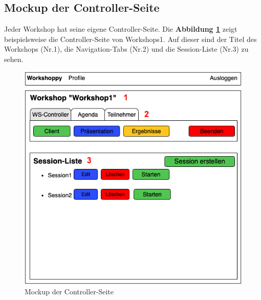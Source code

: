 \newpage
\subsection{Mockup der Controller-Seite}
\label{subsec:mockup der controller-seite}
Jeder Workshop hat seine eigene Controller-Seite. Die \textbf{Abbildung \ref{fig:controller-seite}} zeigt beispielsweise die Controller-Seite von \glqq Workshops1\grqq{}. Auf dieser sind der Titel des Workshops (Nr.1), die Navigation-Tabs (Nr.2) und die Session-Liste (Nr.3) zu sehen.\bigskip

\begin{figure}[H]
  \begin{center}
    \includegraphics[scale=0.45]{img/controllerseite}
	\caption{Mockup der Controller-Seite}  
	\label{fig:controller-seite}
  \end{center}   
\end{figure}


